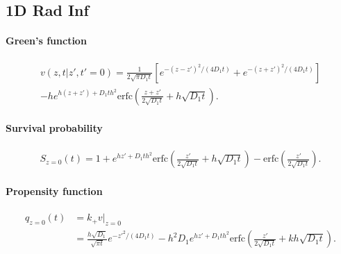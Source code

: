 
\subsection{1D Rad Inf}

\paragraph{Green's function}
\begin{multline}
  v(z,t|z',t'=0) = \frac{1}{2\sqrt{\pi D_1 t}} [
  e^{-(z-z')^2/(4 D_1 t)} +
  e^{-(z+z')^2/(4 D_1 t)} ] \\
  -he^{h(z+z')+D_1th^2} \text{erfc}(\frac{z+z'}{2\sqrt{D_1t}} + h\sqrt{D_1t}) 
  .\label{green-promoter-solo}
\end{multline}

\paragraph{Survival probability}
\begin{align}
  S_{z=0}(t) = 1 +  e^{h z' + D_1 t h^2}
  \text{erfc}(\frac{z'}{2 \sqrt{D_1 t}}  + h \sqrt{D_1 t}) -
  \text{erfc}(\frac{z'}{2 \sqrt{D_1 t}}).
\end{align}

\paragraph{Propensity function}
\begin{align}
  q_{z=0}(t) &= k_+ v|_{z=0} \\
  &= \frac{h \sqrt{D_1}}{\sqrt{\pi t}} e^{-z'^2/(4 D_1 t)}  
  -h^2D_1e^{hz'+D_1th^2} \text{erfc}(\frac{z'}{2\sqrt{D_1t}} + kh\sqrt{D_1t}).  
\end{align}
\begin{multline}
\end{multline}

